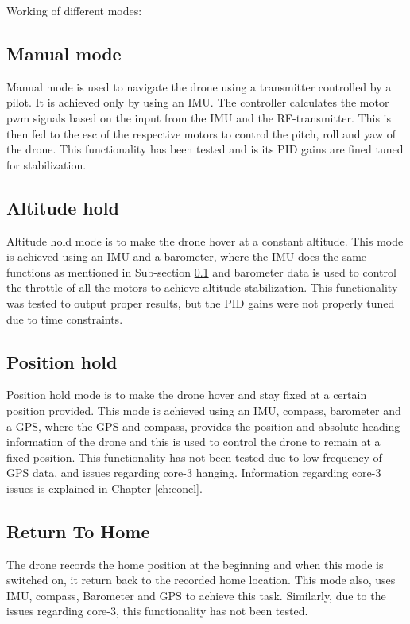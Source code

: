 Working of different modes:
\subsection{Manual mode}\label{subsec:manual_control}
Manual mode is used to navigate the drone using a transmitter controlled by a pilot. It is achieved only by using an IMU. The controller calculates the motor pwm signals based on the input from the IMU and the RF-transmitter. This is then fed to the esc of the respective motors to control the pitch, roll and yaw of the drone. This functionality has been tested and is its PID gains are fined tuned for stabilization.
\subsection{Altitude hold}\label{subsec:altitude_hold}
Altitude hold mode is to make the drone hover at a constant altitude. This mode is achieved using an IMU and a barometer, where the IMU does the same functions as mentioned in Sub-section \ref{subsec:manual_control} and barometer data is used to control the throttle of all the motors to achieve altitude stabilization. This functionality was tested to output proper results, but the PID gains were not properly tuned due to time constraints.
\subsection{Position hold}\label{subsec:position_hold}
Position hold mode is to make the drone hover and stay fixed at a certain position provided. This mode is achieved using an IMU, compass, barometer and a GPS, where the GPS and compass, provides the position and absolute heading information of the drone and this is used to control the drone to remain at a fixed position. This functionality has not been tested due to low frequency of GPS data, and issues regarding core-3 hanging. Information regarding core-3 issues is explained in Chapter \ref{ch:concl}.
\subsection{Return To Home}\label{subsec:rth}
The drone records the home position at the beginning and when this mode is switched on, it return back to the recorded home location. This mode also, uses IMU, compass, Barometer and GPS to achieve this task. Similarly, due to the issues regarding core-3, this functionality has not been tested.
























